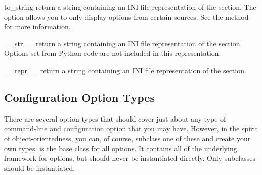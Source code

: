 \documentclass{manual}
\begin{document}
\begin{methoddesc}[ConfigSection]{to\_string}{}
return a string containing an INI file representation of the section.
The  option allows you to only display options from 
certain sources.  See the  method for more
information.
\end{methoddesc}

\begin{methoddesc}[ConfigSection]{\_\_str\_\_}{}
return a string containing an INI file representation of the section.
Options set from Python code are not included in this representation.
\end{methoddesc}

\begin{methoddesc}[ConfigSection]{\_\_repr\_\_}{}
return a string containing an INI file representation of the section.
\end{methoddesc}


\subsection{Configuration Option Types}

There are several option types that should cover just about any type 
of command-line and configuration option that you may have.  However,
in the spirit of object-orientedness, you can, of course, subclass
one of these and create your own types.   is the 
base class for all options.  It contains all of the underlying framework
for options, but should never be instantiated directly.  Only subclasses
should be instantiated.
\end{document}
